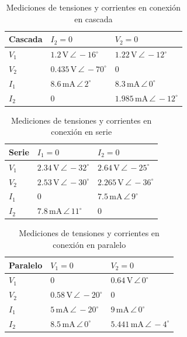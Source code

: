 \documentclass{article}
\begin{document}
\begin{table}[H]
\centering
\begin{tabular}{|l|l|l|}
\hline
\textbf{Cascada} & $I_2 = 0$ & $V_2 = 0$ \\ \hline
$V_1$ & $1.2\,\mathrm{V}\,\angle\,-16^\circ$ & $1.22\,\mathrm{V}\,\angle\,-12^\circ$ \\ \hline
$V_2$ & $0.435\,\mathrm{V}\,\angle\,-70^\circ$ & $0$ \\ \hline
$I_1$ & $8.6\,\mathrm{mA}\,\angle\,2^\circ$ & $8.3\,\mathrm{mA}\,\angle\,0^\circ$ \\ \hline
$I_2$ & $0$ & $1.985\,\mathrm{mA}\,\angle\,-12^\circ$ \\ \hline
\end{tabular}
\caption{Mediciones de tensiones y corrientes en conexión en cascada}
\label{tab:corrientes_tensiones_cascada}
\end{table}

\begin{table}[H]
\centering
\begin{tabular}{|l|l|l|}
\hline
\textbf{Serie} & $I_1 = 0$ & $I_2 = 0$ \\ \hline
$V_1$ & $2.34\,\mathrm{V}\,\angle\,-32^\circ$ & $2.64\,\mathrm{V}\,\angle\,-25^\circ$ \\ \hline
$V_2$ & $2.53\,\mathrm{V}\,\angle\,-30^\circ$ & $2.265\,\mathrm{V}\,\angle\,-36^\circ$ \\ \hline
$I_1$ & $0$ & $7.5\,\mathrm{mA}\,\angle\,9^\circ$ \\ \hline
$I_2$ & $7.8\,\mathrm{mA}\,\angle\,11^\circ$ & $0$ \\ \hline
\end{tabular}
\caption{Mediciones de tensiones y corrientes en conexión en serie}
\label{tab:corrientes_tensiones_serie}
\end{table}

\begin{table}[H]
\centering
\begin{tabular}{|l|l|l|}
\hline
\textbf{Paralelo} & $V_1 = 0$ & $V_2 = 0$ \\ \hline
$V_1$ & $0$ & $0.64\,\mathrm{V}\,\angle\,0^\circ$ \\ \hline
$V_2$ & $0.58\,\mathrm{V}\,\angle\,-20^\circ$ & $0$ \\ \hline
$I_1$ & $5\,\mathrm{mA}\,\angle\,-20^\circ$ & $9\,\mathrm{mA}\,\angle\,0^\circ$ \\ \hline
$I_2$ & $8.5\,\mathrm{mA}\,\angle\,0^\circ$ & $5.441\,\mathrm{mA}\,\angle\,-4^\circ$ \\ \hline
\end{tabular}
\caption{Mediciones de tensiones y corrientes en conexión en paralelo}
\label{tab:corrientes_tensiones_paralelo}
\end{table}
\end{document}
